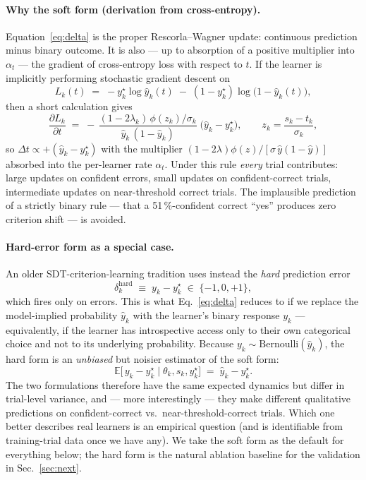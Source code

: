 \documentclass[11pt]{article}
\begin{document}
\paragraph{Why the soft form (derivation from cross-entropy).}
Equation~\ref{eq:delta} is the proper Rescorla--Wagner update:
continuous prediction minus binary outcome. It is also — up to
absorption of a positive multiplier into $\alpha_t$ — the gradient
of cross-entropy loss with respect to $t$. If the learner is
implicitly performing stochastic gradient descent on
\[
  L_k(t) \;=\; -y_k^{\star}\log\hat y_k(t)
              \;-\; (1 - y_k^{\star})\log\bigl(1 - \hat y_k(t)\bigr),
\]
then a short calculation gives
\begin{equation}
  \frac{\partial L_k}{\partial t}
  \;=\; -\,\frac{(1 - 2\lambda_k)\,\phi(z_k)/\sigma_k}
                {\hat y_k\,(1 - \hat y_k)}
        \;\bigl(\hat y_k - y_k^{\star}\bigr),
  \qquad z_k = \frac{s_k - t_k}{\sigma_k},
  \label{eq:cegradient}
\end{equation}
so $\Delta t \propto +(\hat y_k - y_k^{\star})$ with the multiplier
$(1{-}2\lambda)\phi(z)/[\sigma\,\hat y(1{-}\hat y)]$ absorbed into the
per-learner rate $\alpha_t$. Under this rule \emph{every} trial
contributes: large updates on confident errors, small updates on
confident-correct trials, intermediate updates on near-threshold
correct trials. The implausible prediction of a strictly binary rule
— that a 51\,\%-confident correct ``yes'' produces zero criterion
shift — is avoided.

\paragraph{Hard-error form as a special case.}
An older SDT-criterion-learning tradition
\citep{kac1962criterion,friedman1968criterion,stuttgen2011trial} uses
instead the \emph{hard} prediction error
\begin{equation}
  \delta_k^{\mathrm{hard}}
  \;\equiv\; y_k - y_k^{\star}
  \;\in\; \{-1, 0, +1\},
  \label{eq:deltahard}
\end{equation}
which fires only on errors. This is what Eq.~\ref{eq:delta} reduces
to if we replace the model-implied probability $\hat y_k$ with the
learner's binary response $y_k$ — equivalently, if the learner has
introspective access only to their own categorical choice and not to
its underlying probability. Because $y_k \sim \mathrm{Bernoulli}(\hat
y_k)$, the hard form is an \emph{unbiased} but noisier estimator of
the soft form:
\begin{equation}
  \mathbb{E}\!\bigl[\,y_k - y_k^{\star} \mid \theta_k, s_k, y_k^{\star}\bigr]
  \;=\; \hat y_k - y_k^{\star}.
  \label{eq:hard-unbiased}
\end{equation}
The two formulations therefore have the same expected dynamics but
differ in trial-level variance, and — more interestingly — they make
different qualitative predictions on confident-correct vs.\
near-threshold-correct trials. Which one better describes real
learners is an empirical question (and is identifiable from
training-trial data once we have any). We take the soft form as the
default for everything below; the hard form is the natural ablation
baseline for the validation in Sec.~\ref{sec:next}.
\end{document}
